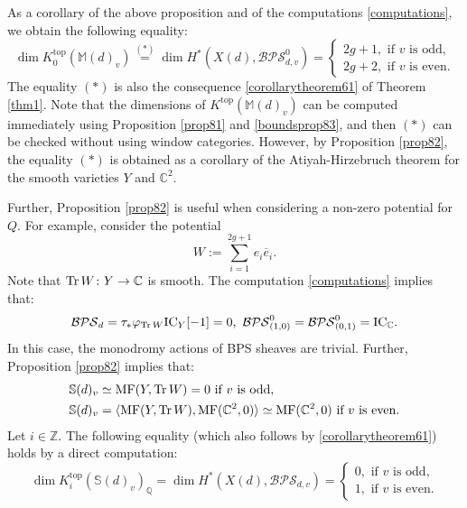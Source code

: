 \documentclass [11pt,oneside,a4paper,mathscr]{amsart}
\theoremstyle{definition}
\newcommand{\Tr}{\mathop{\rm Tr}}
\begin{document}
As a corollary of the above proposition and of the computations \eqref{computations}, we obtain the following equality: 
\[\dim K^{\mathrm{top}}_0(\mathbb{M}(d)_v)\stackrel{(*)}{=}\dim H^{\ast}(X(d), \mathcal{BPS}^0_{d,v})=\begin{cases} 2g+1,\text{ if }v\text{ is odd},\\
2g+2,\text{ if }v\text{ is even}.
\end{cases}\]
The equality $(*)$ is also the consequence \eqref{corollarytheorem61} of Theorem \ref{thm1}.
Note that the dimensions of $K^{\mathrm{top}}(\mathbb{M}(d)_v)$ can be computed immediately using Proposition \ref{prop81} and \eqref{boundsprop83}, and then $(*)$ can be checked without using window categories.
However, by Proposition \ref{prop82}, the equality $(*)$ is obtained as a corollary of the Atiyah-Hirzebruch theorem for the smooth varieties $Y$ and $\mathbb{C}^2$. 

Further, Proposition \ref{prop82} is useful when considering a non-zero potential for $Q$. 
For example, consider the potential \[W:=\sum_{i=1}^{2g+1}e_i\overline{e}_i.\]
Note that $\Tr W\colon Y\to \mathbb{C}$ is smooth. The computation \eqref{computations} implies that:
\begin{equation}\label{computations2}
    \mathcal{BPS}_d=\tau_*\varphi_{\Tr W}\mathrm{IC}_{Y}[-1]=0, \  \mathcal{BPS}^0_{(1,0)}=\mathcal{BPS}^0_{(0,1)}=\mathrm{IC}_{\mathbb{C}}.
\end{equation}
In this case, the monodromy actions of
BPS sheaves are trivial.
Further, Proposition \ref{prop82} implies that:
\begin{align*}
    \mathbb{S}(d)_v&\simeq \mathrm{MF}(Y, \Tr W)=0 \text{ if }v\text{ is odd},\\ \mathbb{S}(d)_v&=\langle \mathrm{MF}(Y, \Tr W), \mathrm{MF}(\mathbb{C}^2, 0)\rangle\simeq \mathrm{MF}(\mathbb{C}^2, 0)\text{ if }v\text{ is even}.
\end{align*}
Let $i\in \mathbb{Z}$.
The following equality (which also follows by \eqref{corollarytheorem61}) holds by a direct computation:
\[\dim K^{\mathrm{top}}_i(\mathbb{S}(d)_v)_{\mathbb{Q}}=\dim H^{\ast}(X(d), \mathcal{BPS}_{d,v})=\begin{cases} 0,\text{ if }v\text{ is odd},\\
1,\text{ if }v\text{ is even}.
\end{cases}\]
\end{document}
